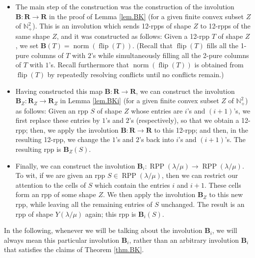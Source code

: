 \documentclass[numbers=enddot,12pt,final,onecolumn,notitlepage]{scrartcl}%
\theoremstyle{definition}
\begin{document}
\begin{itemize}
\item The main step of the construction was the construction of the involution
$\mathbf{B}:\mathbf{R}\rightarrow\mathbf{R}$ in the proof of
Lemma \ref{lem.BK} (for a
given finite convex subset $Z$ of $\mathbb{N}_{+}^{2}$). This is an involution
which sends 12-rpps of shape $Z$ to 12-rpps of the same shape $Z$, and it was
constructed as follows: Given a 12-rpp $T$ of shape $Z$, we set $\mathbf{B}%
\left(  T\right)  =\operatorname*{norm}\left(  \operatorname*{flip}\left(
T\right)  \right)  $. (Recall that $\operatorname*{flip}\left(  T\right)  $
fills all the 1-pure columns of $T$ with $2$'s while simultaneously filling
all the 2-pure columns of $T$ with $1$'s. Recall furthermore that
$\operatorname*{norm}\left(  \operatorname*{flip}\left(  T\right)  \right)  $
is obtained from $\operatorname*{flip}\left(  T\right)  $ by repeatedly
resolving conflicts until no conflicts remain.)

\item Having constructed this map $\mathbf{B}:\mathbf{R}\rightarrow\mathbf{R}%
$, we can construct the involution $\mathbf{B}_{Z}:\mathbf{R}_{Z}%
\rightarrow\mathbf{R}_{Z}$ in Lemma \ref{lem.BKi} (for a given finite convex
subset $Z$ of $\mathbb{N}_{+}^{2}$) as follows: Given an rpp $S$ of shape $Z$
whose entries are $i$'s and $\left(  i+1\right)  $'s, we first replace these
entries by $1$'s and $2$'s (respectively), so that we obtain a 12-rpp; then,
we apply the involution $\mathbf{B}:\mathbf{R}\rightarrow\mathbf{R}$ to this
12-rpp; and then, in the resulting 12-rpp, we change the $1$'s and $2$'s back
into $i$'s and $\left(  i+1\right)  $'s. The resulting rpp is $\mathbf{B}%
_{Z}\left(  S\right)  $.

\item Finally, we can construct the involution $\mathbf{B}_{i}%
:\operatorname*{RPP}\left(  \lambda/\mu\right)  \rightarrow\operatorname*{RPP}%
\left(  \lambda/\mu\right)  $. To wit, if we are given an rpp $S\in
\operatorname*{RPP}\left(  \lambda/\mu\right)  $, then we can restrict our
attention to the cells of $S$ which contain the entries $i$ and $i+1$. These
cells form an rpp of some shape $Z$. We then apply the involution
$\mathbf{B}_{Z}$ to this new rpp, while leaving all the remaining entries of
$S$ unchanged. The result is an rpp of shape $Y\left(  \lambda/\mu\right)  $
again; this rpp is $\mathbf{B}_{i}\left(  S\right)  $.
\end{itemize}

In the following, whenever we will be talking about the involution
$\mathbf{B}_{i}$, we will always mean this particular involution
$\mathbf{B}_{i}$, rather than an arbitrary involution $\mathbf{B}_{i}$ that
satisfies the claims of Theorem \ref{thm.BK}.
\end{document}
